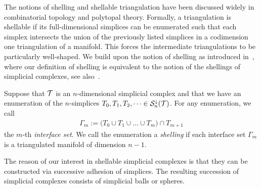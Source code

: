 \documentclass[10pt,a4paper]{article}
\newcommand{\mwl}[1]{{\color{red}#1}}
\begin{document}
The notions of shelling and shellable triangulation have been discussed widely in combinatorial topology and polytopal theory. 
Formally, a triangulation is shellable if its full-dimensional simplices can be enumerated such that each simplex intersects the union of the previously listed simplices in a codimension one triangulation of a manifold. 
This forces the intermediate triangulations to be particularly well-shaped. 
We build upon the notion of shelling as introduced in~\cite[Definition 8.1]{ziegler1995lectures},
where our definition of shelling is equivalent to the notion of the shellings of simplicial complexes, see also~\cite[Remark~8.3]{ziegler1995lectures}. 




Suppose that ${\mathcal T}$ is an $n$-dimensional simplicial complex and that we have an enumeration of the $n$-simplices $T_{0}, T_{1}, T_{2}, \dots \in {\mathcal S}^{\downarrow}_{n}({\mathcal T})$.
For any enumeration, we call 
\begin{align*}
    \Gamma_m 
    := 
    \big( 
        T_{0} \cup T_{1} \cup \dots \cup T_{m} 
    \big) 
    \cap 
    T_{m+1}
\end{align*}
the $m$-th \emph{interface set}. 
We call the enumeration a \emph{shelling} if each interface set $\Gamma_m$ is a triangulated manifold of dimension $n-1$. 

The reason of our interest in shellable simplicial complexes is that they can be constructed via successive adhesion of simplices.
The resulting succession of simplicial complexes consists of simplicial balls or spheres. 
\end{document}
